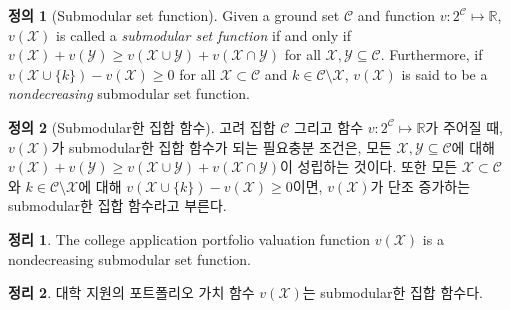 \documentclass[11pt]{article} %
\newtheorem{theorem}{Theorem}
\theoremstyle{definition}
\newtheorem{definition}{Definition}
\newtheorem{theorem}{정리}
\theoremstyle{definition}
\newtheorem{definition}{정의}
\begin{document}
\ifen
\begin{definition}[Submodular set function]
Given a ground set $\mathcal{C}$ and function $v : 2^{\mathcal{C}} \mapsto \mathbb{R}$, $v(\mathcal{X})$ is called a \emph{submodular set function} if and only if $v(\mathcal{X}) + v(\mathcal{Y}) \geq v(\mathcal{X}\cup\mathcal{Y}) + v(\mathcal{X}\cap\mathcal{Y})$
for all $\mathcal{X}, \mathcal{Y} \subseteq \mathcal{C}$. Furthermore, if $ v(\mathcal{X}\cup\{k\}) - v(\mathcal{X}) \geq 0$ for all $\mathcal{X} \subset \mathcal{C}$ and $k \in \mathcal{C} \setminus \mathcal{X}$, $v(\mathcal{X})$ is said to be a \emph{nondecreasing} submodular set function.
\end{definition}
\else
\begin{definition}[Submodular한 집합 함수]
고려 집합 $\mathcal{C}$ 그리고 함수 $v : 2^{\mathcal{C}} \mapsto \mathbb{R}$가 주어질 때, $v(\mathcal{X})$가 submodular한 집합 함수가 되는 필요충분 조건은, 모든 $\mathcal{X}, \mathcal{Y} \subseteq \mathcal{C}$에 대해 $v(\mathcal{X}) + v(\mathcal{Y}) \geq v(\mathcal{X}\cup\mathcal{Y}) + v(\mathcal{X}\cap\mathcal{Y})$이 성립하는 것이다. 또한 모든 $\mathcal{X} \subset \mathcal{C}$와 $k \in \mathcal{C} \setminus \mathcal{X}$에 대해 $v(\mathcal{X}\cup\{k\}) - v(\mathcal{X}) \geq 0$이면, $v(\mathcal{X})$가 단조 증가하는 submodular한 집합 함수라고 부른다.
\end{definition}
\fi

\ifen
\begin{theorem}
The college application portfolio valuation function
$v(\mathcal{X})$ %
is a nondecreasing submodular set function.
\end{theorem}
\else
\begin{theorem}
대학 지원의 포트폴리오 가치 함수 $v(\mathcal{X})$는 submodular한 집합 함수다.
\end{theorem}
\fi
\end{document}
